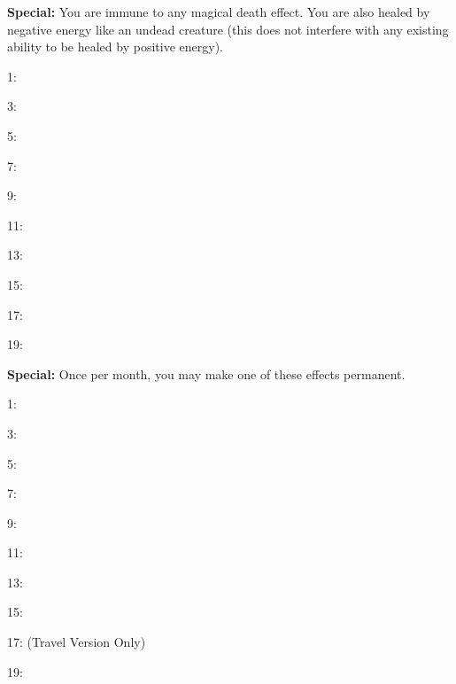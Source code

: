 \begin{multicols}{2}
\begin{description*}
\item {}
\item \textbf{Special:} You are immune to any magical death effect. You are also healed by negative energy like an undead creature (this does not interfere with any existing ability to be healed by positive energy).
	\item[1:] 
	\item[3:] 
	\item[5:] 
	\item[7:] 
	\item[9:] 
	\item[11:] 
	\item[13:] 
	\item[15:] 
	\item[17:] 
	\item[19:] 
\end{description*}

\begin{description*}
\item {}
\item \textbf{Special:} Once per month, you may make one of these effects permanent.
	\item[1:] 
	\item[3:] 
	\item[5:] 
	\item[7:] 
	\item[9:] 
	\item[11:] 
	\item[13:] 
	\item[15:] 
	\item[17:]  (Travel Version Only)
	\item[19:] 
\end{description*}


\end{multicols}
